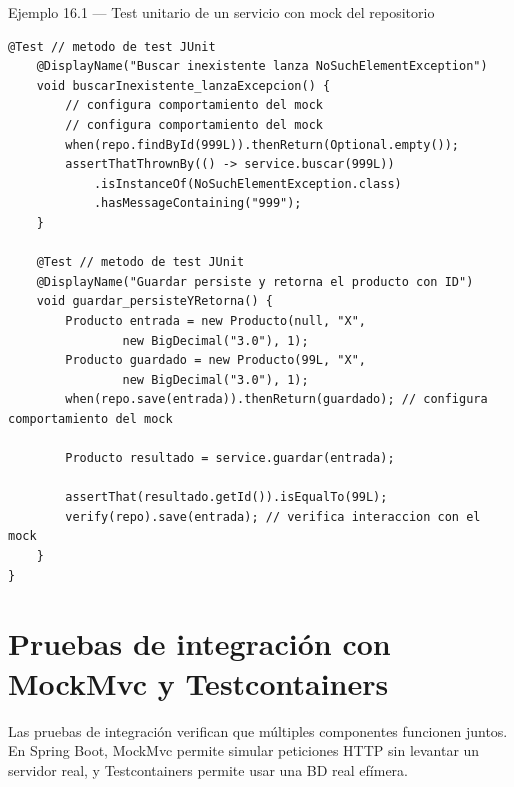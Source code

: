 \begin{cajaejemplo}{Ejemplo 16.1 --- Test unitario de un servicio con mock del repositorio}
\begin{lstlisting}[style=java,caption={ProductoServiceTest.java},label=lst:16.1]
    @Test // metodo de test JUnit
    @DisplayName("Buscar inexistente lanza NoSuchElementException")
    void buscarInexistente_lanzaExcepcion() {
        // configura comportamiento del mock
        // configura comportamiento del mock
        when(repo.findById(999L)).thenReturn(Optional.empty());
        assertThatThrownBy(() -> service.buscar(999L))
            .isInstanceOf(NoSuchElementException.class)
            .hasMessageContaining("999");
    }

    @Test // metodo de test JUnit
    @DisplayName("Guardar persiste y retorna el producto con ID")
    void guardar_persisteYRetorna() {
        Producto entrada = new Producto(null, "X",
                new BigDecimal("3.0"), 1);
        Producto guardado = new Producto(99L, "X",
                new BigDecimal("3.0"), 1);
        when(repo.save(entrada)).thenReturn(guardado); // configura comportamiento del mock

        Producto resultado = service.guardar(entrada);

        assertThat(resultado.getId()).isEqualTo(99L);
        verify(repo).save(entrada); // verifica interaccion con el mock
    }
}
\end{lstlisting}
\end{cajaejemplo}

\section{Pruebas de integración con MockMvc y Testcontainers}

Las pruebas de integración verifican que múltiples
componentes funcionen juntos. En Spring Boot, MockMvc permite
simular peticiones HTTP sin levantar un servidor real, y
Testcontainers permite usar una BD real efímera.


